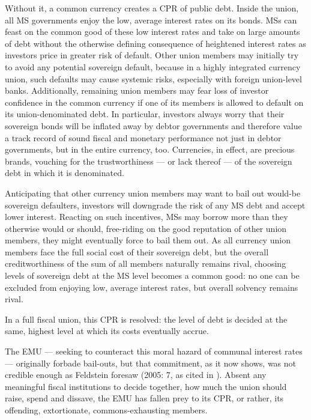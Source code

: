 \documentclass[11pt,a4paper,oneside,openright]{article}
\begin{document}
Without it, a common currency creates a \gls{CPR} of public debt. 
Inside the union, all \gls{MS} governments enjoy the low, average interest rates on its bonds. 
\glspl{MS} can feast on the common good of these low interest rates and take on large amounts of debt without the otherwise defining consequence of heightened interest rates as investors price in greater risk of default. %
Other union members may initially try to avoid any potential sovereign default, because in a highly integrated currency union, such defaults may cause systemic risks, especially with foreign union-level banks. 
Additionally, remaining union members may fear loss of investor confidence in the common currency if one of its members is allowed to default on its union-denominated debt. 
In particular, investors always worry that their sovereign bonds will be inflated away by debtor governments and therefore value a track record of sound fiscal and monetary performance not just in debtor governments, but in the entire currency, too. 
Currencies, in effect, are precious brands, vouching for the trustworthiness --- or lack thereof --- of the sovereign debt in which it is denominated.

Anticipating that other currency union members may want to bail out would-be sovereign defaulters, investors will downgrade the risk of any \gls{MS} debt and accept lower interest. 
Reacting on such incentives, \glspl{MS} may borrow more than they otherwise would or should, free-riding on the good reputation of other union members, they might eventually force to bail them out. 
As all currency union members face the full social cost of their sovereign debt, but the overall creditworthiness of the sum of all members naturally remains rival, choosing levels of sovereign debt at the \gls{MS} level becomes a common good: 
no one can be excluded from enjoying low, average interest rates, but overall solvency remains rival.

In a full fiscal union, this \gls{CPR} is resolved: 
the level of debt is decided at the same, highest level at which its costs eventually accrue. 

The \gls{EMU} --- seeking to counteract this moral hazard of communal interest rates --- originally forbade bail-outs, but that commitment, as it now shows, was not credible enough as Feldstein foresaw (2005: 7, as cited in \citealt[13]{Begg2008}). 
Absent any meaningful fiscal institutions to decide together, how much the union should raise, spend and dissave, the \gls{EMU} has fallen prey to its \gls{CPR}, or rather, its offending, extortionate, commons-exhausting members. 
\end{document}
